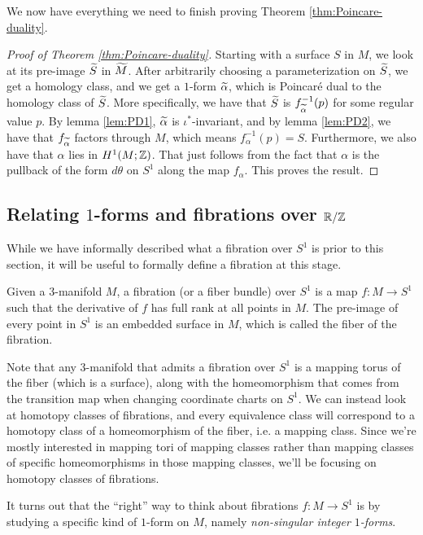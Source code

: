We now have everything we need to finish proving Theorem \ref{thm:Poincare-duality}.
\begin{proof}[Proof of Theorem \ref{thm:Poincare-duality}]
  Starting with a surface $S$ in $M$, we look at its pre-image $\widetilde{S}$ in $\widetilde{M}$. After
  arbitrarily choosing a parameterization on $\widetilde{S}$, we get a homology class, and we get a
  $1$-form $\widetilde{\alpha}$, which is Poincar\'e dual to the homology class of $\widetilde{S}$.  More
  specifically, we have that $\widetilde{S}$ is $f^{-1}_{\widetilde{\alpha}}(p)$ for some regular value $p$.
  By lemma \ref{lem:PD1}, $\widetilde{\alpha}$ is $\iota^{\ast}$-invariant, and by lemma \ref{lem:PD2},
  we have that $f_{\widetilde{\alpha}}$ factors through $M$, which means $f_{\alpha}^{-1}(p) = S$. Furthermore,
  we also have that $\alpha$ lies in $H^1(M; \mathbb{Z})$. That just follows from the fact that $\alpha$
  is the pullback of the form $d\theta$ on $S^1$ along the map $f_{\alpha}$. This proves the result.
\end{proof}

\subsection{Relating $1$-forms and fibrations over $\mathbb{R}/\mathbb{Z}$}
\label{sec:relating-1-forms}
While we have informally described what a fibration over $S^1$ is prior to this section, it will be
useful to formally define a fibration at this stage.
\begin{defn}
  Given a $3$-manifold $M$, a fibration (or a fiber bundle) over $S^1$ is a map $f: M \to S^1$ such
  that the derivative of $f$ has full rank at all points in $M$. The pre-image of every point in
  $S^1$ is an embedded surface in $M$, which is called the fiber of the fibration.
\end{defn}
Note that any $3$-manifold that admits a fibration over $S^1$ is a mapping torus of the fiber (which
is a surface), along with the homeomorphism that comes from the transition map when changing
coordinate charts on $S^1$. We can instead look at homotopy classes of fibrations, and every
equivalence class will correspond to a homotopy class of a homeomorphism of the fiber, i.e. a
mapping class. Since we're mostly interested in mapping tori of mapping classes rather than mapping
classes of specific homeomorphisms in those mapping classes, we'll be focusing on homotopy classes
of fibrations.

It turns out that the ``right'' way to think about fibrations $f: M \to S^1$ is by studying a specific kind
of $1$-form on $M$, namely \emph{non-singular integer $1$-forms}.

